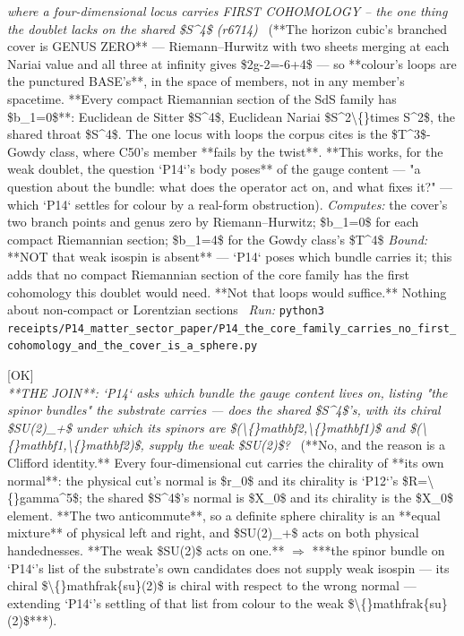 \begin{description}
\textit{where a four-dimensional locus carries FIRST COHOMOLOGY -- the one thing the doublet lacks on the shared \$S\textasciicircum{}4\$ (r6714)} \ (**The horizon cubic's branched cover is GENUS ZERO** --- Riemann--Hurwitz with two sheets merging at each Nariai value and all three at infinity gives \$2g-2=-6+4\$ --- so **colour's loops are the punctured BASE's**, in the space of members, not in any member's spacetime.  **Every compact Riemannian section of the SdS family has \$b\_1=0\$**: Euclidean de Sitter \$S\textasciicircum{}4\$, Euclidean Nariai \$S\textasciicircum{}2\textbackslash\{\}times S\textasciicircum{}2\$, the shared throat \$S\textasciicircum{}4\$. The one locus with loops the corpus cites is the \$T\textasciicircum{}3\$-Gowdy class, where C50's member **fails by the twist**.  **This works, for the weak doublet, the question `P14`'s body poses** of the gauge content --- "a question about the bundle: what does the operator act on, and what fixes it?" --- which `P14` settles for colour by a real-form obstruction). 
\emph{Computes:} the cover's two branch points and genus zero by Riemann--Hurwitz; \$b\_1=0\$ for each compact Riemannian section; \$b\_1=4\$ for the Gowdy class's \$T\textasciicircum{}4\$
 \emph{Bound:}  **NOT that weak isospin is absent** --- `P14` poses which bundle carries it; this adds that no compact Riemannian section of the core family has the first cohomology this doublet would need. **Not that loops would suffice.** Nothing about non-compact or Lorentzian sections
\ \emph{Run:} \texttt{python3 receipts/P14\_matter\_sector\_paper/P14\_the\_core\_family\_carries\_no\_first\_cohomology\_and\_the\_cover\_is\_a\_sphere.py}
\item[\rcptlabel{P14_the_four_spheres_chirality_anticommutes_with_the_physical_one_so_its_su2_is_not_the_weak_one}{P14R86}\textbf{P14R86}\quad\texttt{P14\_the\_four\_spheres\_chirality\_anticommutes\_with\_the\_physical\_one\_so\_its\_su2\_is\_not\_the\_weak\_one}]\hfill\textsf{[OK]}\\
\textit{**THE JOIN**: `P14` asks which bundle the gauge content lives on, listing "the spinor bundles" the substrate carries --- does the shared \$S\textasciicircum{}4\$'s, with its chiral \$SU(2)\_+\$ under which its spinors are \$(\textbackslash\{\}mathbf2,\textbackslash\{\}mathbf1)\$ and \$(\textbackslash\{\}mathbf1,\textbackslash\{\}mathbf2)\$, supply the weak \$SU(2)\$?} \ (**No, and the reason is a Clifford identity.** Every four-dimensional cut carries the chirality of **its own normal**: the physical cut's normal is \$r\_0\$ and its chirality is `P12`'s \$R=\textbackslash\{\}gamma\textasciicircum{}5\$; the shared \$S\textasciicircum{}4\$'s normal is \$X\_0\$ and its chirality is the \$X\_0\$ element. **The two anticommute**, so a definite sphere chirality is an **equal mixture** of physical left and right, and \$SU(2)\_+\$ acts on both physical handednesses. **The weak \$SU(2)\$ acts on one.** \ensuremath{\Rightarrow} ***the spinor bundle on `P14`'s list of the substrate's own candidates does not supply weak isospin --- its chiral \$\textbackslash\{\}mathfrak\{su\}(2)\$ is chiral with respect to the wrong normal --- extending `P14`'s settling of that list from colour to the weak \$\textbackslash\{\}mathfrak\{su\}(2)\$***). 

\end{description}
